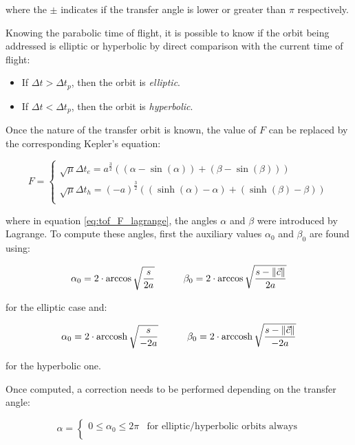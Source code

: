 where the $\pm$ indicates if the transfer angle is lower or greater than $\pi$
respectively.

Knowing the parabolic time of flight, it is possible to know if the orbit being
addressed is elliptic or hyperbolic by direct comparison with the current time
of flight:

\begin{itemize}
  \item If $\Delta t > \Delta t_p$, then the orbit is \textit{elliptic}.
  \item If $\Delta t < \Delta t_p$, then the orbit is \textit{hyperbolic}.
\end{itemize}

Once the nature of the transfer orbit is known, the value of $F$ can be
replaced by the corresponding Kepler's equation:

\begin{equation}
  F =
  \begin{cases}
    \sqrt{\mu} \Delta t_e = a^{\frac{3}{2}}\left((\alpha - \sin{(\alpha)}) + (\beta - \sin{(\beta)}) \right)      \\
    \sqrt{\mu} \Delta t_h = (-a)^{\frac{3}{2}}\left((\sinh{(\alpha)} - \alpha) + (\sinh{(\beta)} - \beta) \right) \\
  \end{cases}
  \label{eq:tof_F_lagrange}
\end{equation}

where in equation \ref{eq:tof_F_lagrange}, the angles $\alpha$ and $\beta$ were
introduced by Lagrange. To compute these angles, first the auxiliary values
$\alpha_0$ and $\beta_0$ are found using:

\begin{equation}
  \alpha_0 = 2 \cdot \arccos{\sqrt{\frac{s}{2a}}}\quad\quad\quad
  \beta_0 = 2 \cdot \arccos{\sqrt{\frac{s - \lVert\vec{c}\rVert}{2a}}}
\end{equation}

for the elliptic case and:

\begin{equation}
  \alpha_0 = 2 \cdot \operatorname{arccosh}{\sqrt{\frac{s}{-2a}}}\quad\quad\quad
  \beta_0 = 2 \cdot \operatorname{arccosh}{\sqrt{\frac{s - \lVert\vec{c}\rVert}{-2a}}}
\end{equation}

for the hyperbolic one.

Once computed, a correction needs to be performed depending on the transfer
angle:

\begin{equation}
  \alpha =
  \begin{cases}
    0 \leqslant \alpha_0 \leqslant 2\pi & \text{for elliptic/hyperbolic orbits always} \\
  \end{cases}
\end{equation}

